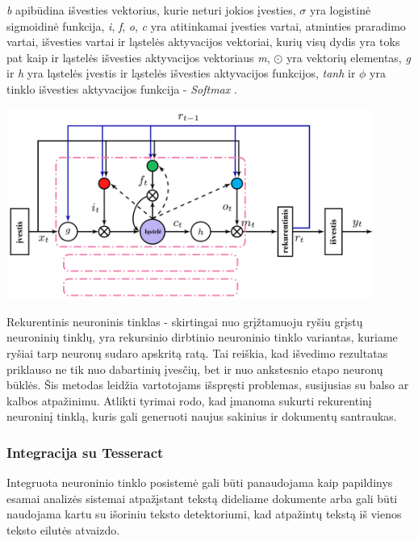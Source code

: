\documentclass{VUMIFInfBakalaurinis}
\begin{document}
\textit{b} apibūdina išvesties vektorius, kurie neturi jokios įvesties,
\(\sigma\) yra logistinė sigmoidinė funkcija, \textit{i}, \textit{f}, \textit{o}, \textit{c} yra atitinkamai
įvesties vartai, atminties praradimo vartai, išvesties vartai ir ląstelės aktyvacijos vektoriai, kurių visų dydis yra toks pat 
kaip ir ląstelės išvesties aktyvacijos vektoriaus \textit{m}, \(\odot\) yra vektorių elementas, \textit{g} ir \textit{h} yra ląstelės
įvestis ir ląstelės išvesties aktyvacijos funkcijos, \textit{tanh} ir \(\phi\) yra tinklo išvesties aktyvacijos funkcija - \textit{Softmax} \cite{sak2014long}.

\begin{minipage}{\linewidth}
  \centering
  \includegraphics[width=12cm]{memory_block.png}
  \label{memory_block}
\end{minipage}

Rekurentinis neuroninis tinklas - skirtingai nuo grįžtamuoju ryšiu grįstų neuroninių tinklų, yra rekursinio 
dirbtinio neuroninio tinklo variantas, kuriame ryšiai tarp neuronų sudaro apskritą ratą. Tai reiškia,
kad išvedimo rezultatas priklauso ne tik nuo dabartinių įvesčių, bet ir nuo ankstesnio etapo neuronų būklės. 
Šis metodas leidžia vartotojams išspręsti problemas, susijusias su balso ar kalbos atpažinimu.
Atlikti tyrimai rodo, kad įmanoma sukurti rekurentinį neuroninį tinklą, kuris gali generuoti naujus sakinius ir dokumentų santraukas.

\subsubsection{Integracija su Tesseract}
Integruota neuroninio tinklo posistemė gali būti panaudojama kaip papildinys esamai analizės sistemai atpažįstant tekstą dideliame dokumente arba
gali būti naudojama kartu su išoriniu teksto detektoriumi, kad atpažintų tekstą iš vienos teksto eilutės atvaizdo.
\end{document}
